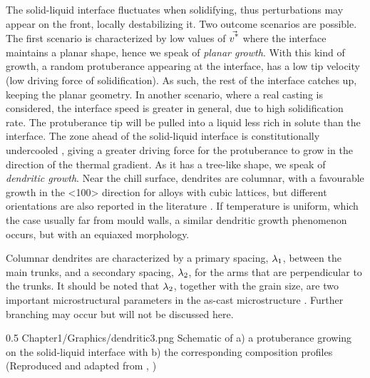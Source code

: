The solid-liquid interface fluctuates when solidifying, thus perturbations may appear on the front, locally destabilizing it. 
Two outcome scenarios are possible.
The first scenario is characterized by low values of $\vec{v^\text{*}}$ where the interface maintains a planar shape, hence we speak of \emph{planar growth}. 
With this kind of growth, a random protuberance appearing at the interface, has a low tip velocity (low driving force of solidification). As such,
the rest of the interface catches up, keeping the planar geometry.
In another scenario, where a real casting is considered, the interface speed is greater in general, due to high solidification rate.
The protuberance tip will be pulled into a liquid less rich in solute than the interface. The zone ahead of the solid-liquid interface is constitutionally undercooled \citep{tiller_redistribution_1953}, giving a greater driving force for the protuberance to grow in the direction
of the thermal gradient. As it has a tree-like shape, we speak of \emph{dendritic growth}. Near the chill surface, dendrites are columnar, with a 
favourable growth in the <100> direction for alloys with cubic lattices, but different orientations are also reported in the literature \citep[see][289]{dantzig_solidification_2009}.
If temperature is uniform, which the case usually far from mould walls, a similar dendritic growth phenomenon occurs, but with an equiaxed morphology.

Columnar dendrites are characterized by a primary spacing, ${\lambda}_{1}$, between the main trunks, and a secondary spacing, ${\lambda}_{2}$, for the arms that are perpendicular
to the trunks. It should be noted that ${\lambda}_{2}$, together with the grain size, are two important microstructural parameters in the as-cast microstructure \citep{easton_grain_2011}.
Further branching may occur but will not be discussed here.
\begin{figureth}
{0.5}
{Chapter1/Graphics/dendritic3.png}
{Schematic of a) a protuberance growing on the solid-liquid interface with b) the corresponding composition profiles 
(Reproduced and adapted from \citet{doitpoms_dissemination_2000}, \doitpoms)}
\label{fig:dendritic_growth}
\end{figureth}
%
%

